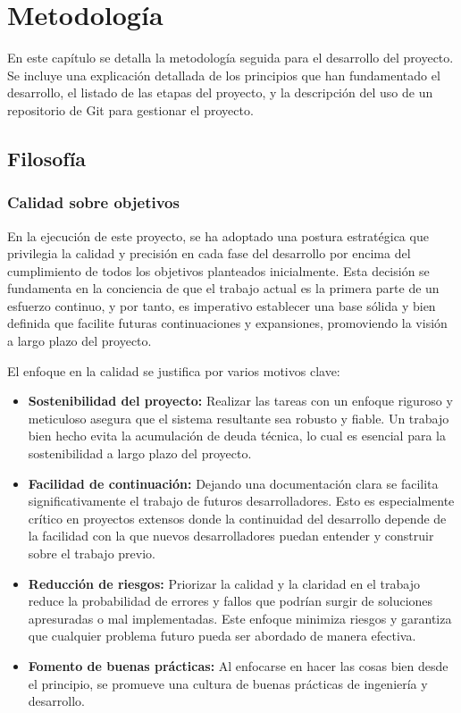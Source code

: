 \chapter{Metodología}

En este capítulo se detalla la metodología seguida para el desarrollo del proyecto. Se incluye una explicación detallada de los principios que han fundamentado el desarrollo, el listado de las etapas del proyecto, y la descripción del uso de un repositorio de Git para gestionar el proyecto.

\section{Filosofía}

\subsection{Calidad sobre objetivos}

En la ejecución de este proyecto, se ha adoptado una postura estratégica que privilegia la calidad y precisión en cada fase del desarrollo por encima del cumplimiento de todos los objetivos planteados inicialmente. Esta decisión se fundamenta en la conciencia de que el trabajo actual es la primera parte de un esfuerzo continuo, y por tanto, es imperativo establecer una base sólida y bien definida que facilite futuras continuaciones y expansiones, promoviendo la visión a largo plazo del proyecto.

El enfoque en la calidad se justifica por varios motivos clave:

\begin{itemize}
	\item \textbf{Sostenibilidad del proyecto:} Realizar las tareas con un enfoque riguroso y meticuloso asegura que el sistema resultante sea robusto y fiable. Un trabajo bien hecho evita la acumulación de deuda técnica, lo cual es esencial para la sostenibilidad a largo plazo del proyecto.
	
	\item \textbf{Facilidad de continuación:} Dejando una documentación clara se facilita significativamente el trabajo de futuros desarrolladores. Esto es especialmente crítico en proyectos extensos donde la continuidad del desarrollo depende de la facilidad con la que nuevos desarrolladores puedan entender y construir sobre el trabajo previo.
	
	\item \textbf{Reducción de riesgos:} Priorizar la calidad y la claridad en el trabajo reduce la probabilidad de errores y fallos que podrían surgir de soluciones apresuradas o mal implementadas. Este enfoque minimiza riesgos y garantiza que cualquier problema futuro pueda ser abordado de manera efectiva.
	
	\item \textbf{Fomento de buenas prácticas:} Al enfocarse en hacer las cosas bien desde el principio, se promueve una cultura de buenas prácticas de ingeniería y desarrollo.
	
\end{itemize}

